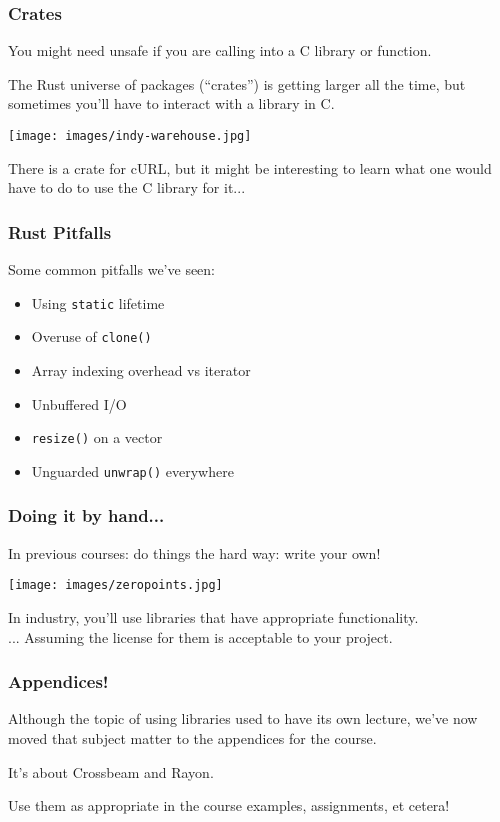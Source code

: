\begin{frame}
\frametitle{Crates}

You might need unsafe if you are calling into a C library or function.

The Rust universe of packages (``crates'') is getting larger all the time, but sometimes you'll have to interact with a library in C.

\begin{center}
	\texttt{[image: images/indy-warehouse.jpg]}
\end{center}

There is a crate for cURL, but it might be interesting to learn what one would have to do to use the C library for it...

\end{frame}

\begin{frame}
\frametitle{Rust Pitfalls}
Some common pitfalls we've seen:

\begin{itemize}
	\item Using \texttt{static} lifetime
	\item Overuse of \texttt{clone()}
	\item Array indexing overhead vs iterator
	\item Unbuffered I/O
	\item \texttt{resize()} on a vector
	\item Unguarded \texttt{unwrap()} everywhere
\end{itemize}

\end{frame}


\begin{frame}
\frametitle{Doing it by hand...}

In previous courses: do things the hard way: write your own!

\begin{center}
	\texttt{[image: images/zeropoints.jpg]}
\end{center}

In industry, you'll use libraries that have appropriate functionality.\\
\quad ... Assuming the license for them is acceptable to your project.

\end{frame}

\begin{frame}
\frametitle{Appendices!}

Although the topic of using libraries used to have its own lecture, we've now moved that subject matter to the appendices for the course.

It's about Crossbeam and Rayon.

Use them as appropriate in the course examples, assignments, et cetera!

\end{frame}



